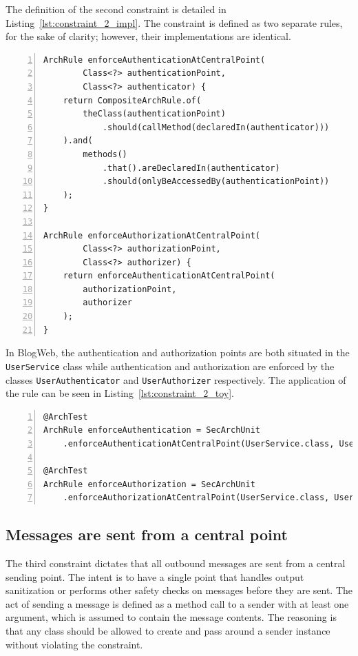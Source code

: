 The definition of the second constraint is detailed in Listing~\ref{lst:constraint_2_impl}. The constraint is defined as two separate rules, for the sake of clarity; however, their implementations are identical.

\begin{minipage}{\linewidth}
\begin{lstlisting}[caption={Rule definition for constraint 2.}, captionpos=b, label=lst:constraint_2_impl, numbers=left]
ArchRule enforceAuthenticationAtCentralPoint(
        Class<?> authenticationPoint,
        Class<?> authenticator) {
    return CompositeArchRule.of(
        theClass(authenticationPoint)
            .should(callMethod(declaredIn(authenticator)))
    ).and(
        methods()
            .that().areDeclaredIn(authenticator)
            .should(onlyBeAccessedBy(authenticationPoint))
    );
}

ArchRule enforceAuthorizationAtCentralPoint(
        Class<?> authorizationPoint,
        Class<?> authorizer) {
    return enforceAuthenticationAtCentralPoint(
        authorizationPoint,
        authorizer
    );
}
\end{lstlisting}
\end{minipage}

In BlogWeb, the authentication and authorization points are both situated in the \texttt{UserService} class while authentication and authorization are enforced by the classes \texttt{UserAuthenticator} and \texttt{UserAuthorizer} respectively. The application of the rule can be seen in Listing~\ref{lst:constraint_2_toy}.

\begin{minipage}{\linewidth}
\begin{lstlisting}[caption={Application of constraint 2 to BlogWeb.}, captionpos=b, label=lst:constraint_2_toy, numbers=left]
@ArchTest
ArchRule enforceAuthentication = SecArchUnit
    .enforceAuthenticationAtCentralPoint(UserService.class, UserAuthenticator.class);

@ArchTest
ArchRule enforceAuthorization = SecArchUnit
    .enforceAuthorizationAtCentralPoint(UserService.class, UserAuthorizer.class);
\end{lstlisting}
\end{minipage}

\subsection{Messages are sent from a central point}
The third constraint dictates that all outbound messages are sent from a central sending point. The intent is to have a single point that handles output sanitization or performs other safety checks on messages before they are sent. The act of sending a message is defined as a method call to a sender with at least one argument, which is assumed to contain the message contents. The reasoning is that any class should be allowed to create and pass around a sender instance without violating the constraint.

